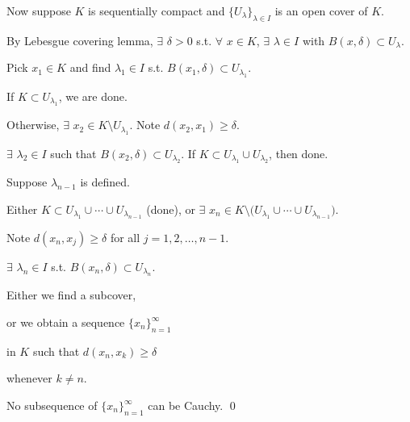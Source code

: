 \documentclass[10pt,aspectratio=149]{beamer}
\begin{document}
\begin{frame}

Now suppose $K$ is sequentially compact and
$\{ U_\lambda \}_{\lambda \in I}$ is an open cover of $K$.

\pause
By Lebesgue covering lemma, $\exists$ $\delta > 0$
s.t. $\forall$ $x \in K$, $\exists$ $\lambda \in I$ with
$B(x,\delta) \subset U_\lambda$.

\pause
\medskip

Pick $x_1 \in K$ and find $\lambda_1 \in I$ s.t. $B(x_1,\delta) \subset U_{\lambda_1}$.

\pause
\medskip

If $K \subset U_{\lambda_1}$, we are done.

\pause
Otherwise, $\exists$ $x_2 \in K \setminus U_{\lambda_1}$.
\pause
\qquad
Note $d(x_2,x_1) \geq \delta$.

\pause
$\exists$ $\lambda_2 \in I$ such that $B(x_2,\delta) \subset U_{\lambda_2}$.
\pause
\qquad
If $K \subset U_{\lambda_1} \cup U_{\lambda_2}$, then done.

\pause
\medskip

Suppose $\lambda_{n-1}$ is defined.

\pause
Either
$K \subset U_{\lambda_1} \cup
\cdots \cup
U_{\lambda_{n-1}}$
(done),
\pause
or
$\exists$ $x_n \in
K \setminus \bigl( U_{\lambda_1} \cup
\cdots \cup U_{\lambda_{n-1}}\bigr)$.

\pause
Note $d(x_n,x_j) \geq \delta$ for all $j = 1,2,\ldots,n-1$.

\pause
$\exists$
$\lambda_n \in I$ s.t. $B(x_n,\delta) \subset U_{\lambda_n}$.

\pause
\vspace*{-0.3in}
\hspace*{2in}



\vspace*{-0.8in}

\pause
Either we find a subcover,

\pause
or we obtain a sequence
$\{ x_n \}_{n=1}^\infty$

in $K$ such that 
$d(x_n,x_k) \geq \delta$

whenever $k \not= n$.

\pause
\medskip

No subsequence of $\{ x_n \}_{n=1}^\infty$ can be
Cauchy.
\pause
\quad \contradiction
\qed

\end{frame}
\end{document}
